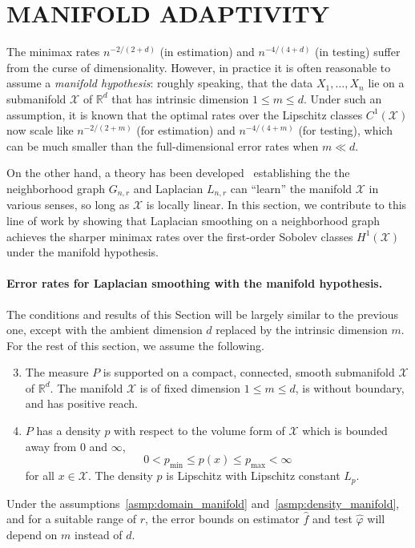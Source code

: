 \documentclass[twoside]{article}
\newcommand{\Reals}{\mathbb{R}}
\newcommand{\1}{\mathbf{1}}
\newcommand{\Rd}{\Reals^d}
\newcommand{\Lap}{L}
\newcommand{\Xset}{\mathcal{X}}
\newcommand{\wh}[1]{\widehat{#1}}
\theoremstyle{definition}
\theoremstyle{remark}
\begin{document}
\section{MANIFOLD ADAPTIVITY}
\label{sec:manifold_adaptivity}
The minimax rates $n^{-2/(2 + d)}$ (in estimation) and $n^{-4/(4 + d)}$ (in testing) suffer from the curse of dimensionality. However, in practice it is often reasonable to assume a \emph{manifold hypothesis}: roughly speaking, that the data $X_1,\ldots,X_n$ lie on a submanifold $\Xset$ of $\Rd$ that has intrinsic dimension $1 \leq m \leq d$. Under such an assumption, it is known \citep{bickel2007, ariascastro2018} that the optimal rates over the Lipschitz classes $C^1(\Xset)$ now scale like $n^{-2/(2 + m)}$ (for estimation) and $n^{-4/(4 + m)}$ (for testing), which can be much smaller than the full-dimensional error rates when $m \ll d$. 

On the other hand, a theory has been developed~\citep{belkin03,belkin05,belkin2006,niyogi2013} establishing the the neighborhood graph $G_{n,r}$ and Laplacian $\Lap_{n,r}$ can ``learn'' the manifold $\Xset$ in various senses, so long as $\Xset$ is locally linear. In this section, we contribute to this line of work by showing that Laplacian smoothing on a neighborhood graph achieves the sharper minimax rates over the first-order Sobolev classes $H^1(\Xset)$ under the manifold hypothesis.

\paragraph{Error rates for Laplacian smoothing with the manifold hypothesis.}
The conditions and results of this Section will be largely similar to the previous one, except with the ambient dimension $d$ replaced by the intrinsic dimension $m$. For the rest of this section, we assume the following.
\begin{enumerate}[label=(P\arabic*)]
	\setcounter{enumi}{2}
	\item 
	\label{asmp:domain_manifold}
	The measure $P$ is supported on a compact, connected, smooth submanifold $\Xset$ of $\Reals^d$. The manifold $\Xset$ is of fixed dimension $1 \leq m \leq d$, is without boundary, and has positive reach. 
	\item 
	\label{asmp:density_manifold} $P$ has a density $p$ with respect to the volume form of $\Xset$ which is bounded away from $0$ and $\infty$,
	\begin{equation*}
	0 < p_{\min} \leq p(x) \leq p_{\max} < \infty
	\end{equation*}
	for all $x \in \Xset$. The density $p$ is Lipschitz with Lipschitz constant $L_p$.
\end{enumerate}
Under the assumptions~\ref{asmp:domain_manifold} and~\ref{asmp:density_manifold}, and for a suitable range of $r$, the error bounds on estimator $\wh{f}$ and test $\wh{\varphi}$ will depend on $m$ instead of $d$. 
\end{document}
